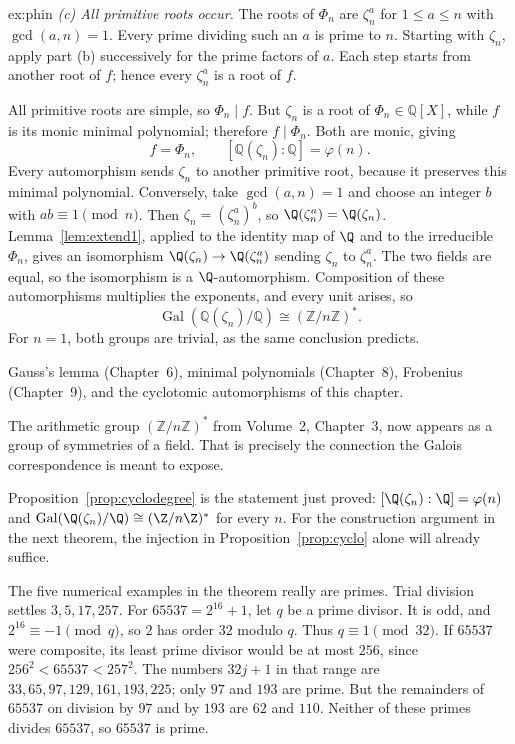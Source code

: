 \begin{solution}{ex:phin}
\emph{(c) All primitive roots occur.}
The roots of $\Phi_n$ are $\zeta_n^a$ for $1\le a\le n$ with $\gcd(a,n)=1$. Every prime dividing such an $a$ is prime to $n$. Starting with $\zeta_n$, apply part (b) successively for the prime factors of $a$. Each step starts from another root of $f$; hence every $\zeta_n^a$ is a root of $f$.

All primitive roots are simple, so $\Phi_n\mid f$. But $\zeta_n$ is a root of $\Phi_n\in\mathbb Q[X]$, while $f$ is its monic minimal polynomial; therefore $f\mid\Phi_n$. Both are monic, giving
\[
\boxed{f=\Phi_n,\qquad [\mathbb Q(\zeta_n):\mathbb Q]=\varphi(n).}
\]
Every automorphism sends $\zeta_n$ to another primitive root, because it preserves this minimal polynomial. Conversely, take $\gcd(a,n)=1$ and choose an integer $b$ with $ab\equiv1\pmod n$. Then $\zeta_n=(\zeta_n^a)^b$, so $\Q(\zeta_n^a)=\Q(\zeta_n)$. Lemma~\ref{lem:extend1}, applied to the identity map of $\Q$ and to the irreducible $\Phi_n$, gives an isomorphism $\Q(\zeta_n)\to\Q(\zeta_n^a)$ sending $\zeta_n$ to $\zeta_n^a$. The two fields are equal, so the isomorphism is a $\Q$-automorphism. Composition of these automorphisms multiplies the exponents, and every unit arises, so
\[
\boxed{\operatorname{Gal}(\mathbb Q(\zeta_n)/\mathbb Q)
       \cong(\mathbb Z/n\mathbb Z)^*.}
\]
For $n=1$, both groups are trivial, as the same conclusion predicts.

\tools Gauss's lemma (Chapter~6), minimal polynomials (Chapter~8), Frobenius (Chapter~9), and the cyclotomic automorphisms of this chapter.

\leads The arithmetic group $(\mathbb Z/n\mathbb Z)^*$ from Volume~2, Chapter~3, now appears as a group of symmetries of a field. That is precisely the connection the Galois correspondence is meant to expose.
\end{solution}

Proposition~\ref{prop:cyclodegree} is the statement just proved: $[\Q(\zeta_n):\Q]=\varphi(n)$ and
$\operatorname{Gal}(\Q(\zeta_n)/\Q)\cong(\Z/n\Z)^*$ for every $n$.
For the construction argument in the next theorem, the injection in Proposition~\ref{prop:cyclo} alone
will already suffice.

The five numerical examples in the theorem really are primes. Trial division
settles $3,5,17,257$. For $65537=2^{16}+1$, let $q$ be a prime divisor.
It is odd, and $2^{16}\equiv-1\pmod q$, so $2$ has order $32$ modulo $q$.
Thus $q\equiv1\pmod{32}$. If $65537$ were composite, its least prime
divisor would be at most $256$, since $256^2<65537<257^2$.
The numbers $32j+1$ in that range are
$33,65,97,129,161,193,225$; only $97$ and $193$ are prime.
But the remainders of $65537$ on division by $97$ and by $193$ are $62$ and $110$.
Neither of these primes divides $65537$, so $65537$ is prime.

